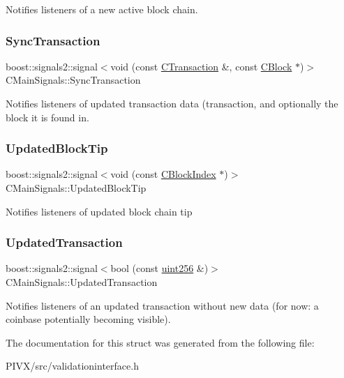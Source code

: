 Notifies listeners of a new active block chain. \mbox{\label{struct_c_main_signals_a7ced7f332ed90d57110a78ad50d5a60f}} 
\subsubsection{\texorpdfstring{Sync\+Transaction}{SyncTransaction}}
{\footnotesize\ttfamily boost\+::signals2\+::signal$<$void (const \mbox{\hyperlink{class_c_transaction}{C\+Transaction}} \&, const \mbox{\hyperlink{class_c_block}{C\+Block}} $\ast$)$>$ C\+Main\+Signals\+::\+Sync\+Transaction}

Notifies listeners of updated transaction data (transaction, and optionally the block it is found in. \mbox{\label{struct_c_main_signals_a0380ea185992a8ee3572b5cf2aaa7677}} 
\subsubsection{\texorpdfstring{Updated\+Block\+Tip}{UpdatedBlockTip}}
{\footnotesize\ttfamily boost\+::signals2\+::signal$<$void (const \mbox{\hyperlink{class_c_block_index}{C\+Block\+Index}} $\ast$)$>$ C\+Main\+Signals\+::\+Updated\+Block\+Tip}

Notifies listeners of updated block chain tip \mbox{\label{struct_c_main_signals_a5c4626fe1ae15530b27a29cde74ed9c2}} 
\subsubsection{\texorpdfstring{Updated\+Transaction}{UpdatedTransaction}}
{\footnotesize\ttfamily boost\+::signals2\+::signal$<$bool (const \mbox{\hyperlink{classuint256}{uint256}} \&)$>$ C\+Main\+Signals\+::\+Updated\+Transaction}

Notifies listeners of an updated transaction without new data (for now\+: a coinbase potentially becoming visible). 

The documentation for this struct was generated from the following file\+:\begin{DoxyCompactItemize}
\item 
P\+I\+V\+X/src/validationinterface.\+h\end{DoxyCompactItemize}
